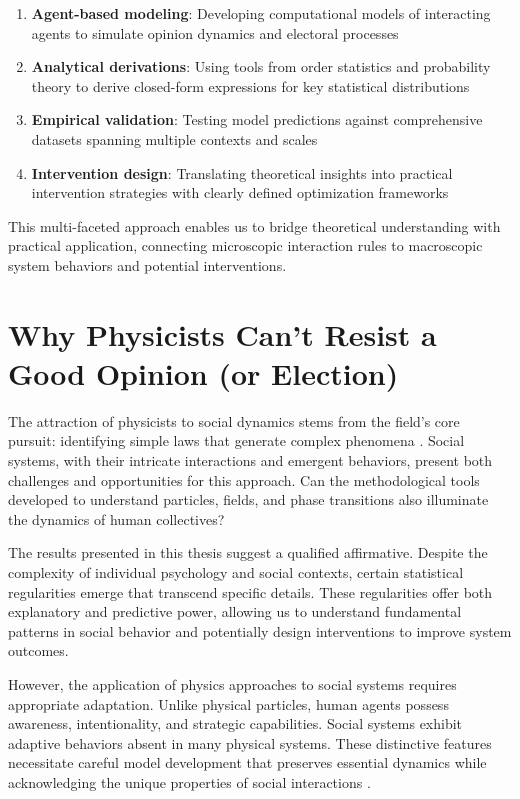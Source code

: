 \begin{enumerate}
\item \textbf{Agent-based modeling}: Developing computational models of interacting agents to simulate opinion dynamics and electoral processes
\item \textbf{Analytical derivations}: Using tools from order statistics and probability theory to derive closed-form expressions for key statistical distributions
\item \textbf{Empirical validation}: Testing model predictions against comprehensive datasets spanning multiple contexts and scales
\item \textbf{Intervention design}: Translating theoretical insights into practical intervention strategies with clearly defined optimization frameworks
\end{enumerate}

This multi-faceted approach enables us to bridge theoretical understanding with practical application, connecting microscopic interaction rules to macroscopic system behaviors and potential interventions.

\section{Why Physicists Can't Resist a Good Opinion (or Election)}

The attraction of physicists to social dynamics stems from the field's core pursuit: identifying simple laws that generate complex phenomena \cite{galam2012sociophysics}. Social systems, with their intricate interactions and emergent behaviors, present both challenges and opportunities for this approach. Can the methodological tools developed to understand particles, fields, and phase transitions also illuminate the dynamics of human collectives?

The results presented in this thesis suggest a qualified affirmative. Despite the complexity of individual psychology and social contexts, certain statistical regularities emerge that transcend specific details. These regularities offer both explanatory and predictive power, allowing us to understand fundamental patterns in social behavior and potentially design interventions to improve system outcomes.

However, the application of physics approaches to social systems requires appropriate adaptation. Unlike physical particles, human agents possess awareness, intentionality, and strategic capabilities. Social systems exhibit adaptive behaviors absent in many physical systems. These distinctive features necessitate careful model development that preserves essential dynamics while acknowledging the unique properties of social interactions \cite{competing-opinions-and-stubborness-connecting-models-to-data}.


